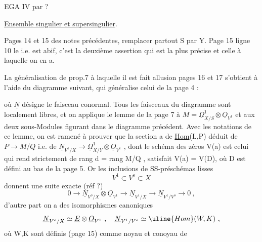 \margin{//}  

\margin{(}EGA IV par ?

\uline{Ensemble singulier et supersingulier}.

Pages 14 et 15 des notes précédentes, remplacer partout S par Y. Page
15 ligne 10 le i.e. est abif, c'est la deuxième assertion qui est la
plus précise et celle à laquelle on en a.

La généralisation de prop.7 à laquelle il est fait allusion pages 16
et 17 s'obtient à l'aide du diagramme suivant, qui généralise celui de la
page 4 :

où $\underline{N}$ désigne le faisceau conormal. Tous les faisceaux du diagramme sont
localement libres, et on applique le lemme de la page 7 à $M=\underline{\Omega}^1_{X/S}\otimes\underline{O}_{V^1}$
et aux deux sous-Modules figurant dans le diagramme précédent. Avec
les notations de ce lemme, on est ramené à prouver que la section a
 de \uline{Hom}(L,P) déduit de \inserted{$\mu$:} $P\rightarrow M/Q$ i.e. de \inserted{$\mu$:} $\underline{N}_{V^1/X}\longrightarrow\underline{\Omega}^1_{X/Y}\otimes\underline{O}_{V^1}$ ,
dont le schéma des zéros V(a) est celui qui rend \hand{$\mu$} strictement de rang
\hand{$<$} d = rang M/Q , satisfait V(a) = V(D), où D est défini au bas de la
page 5. Or les inclusions de SS-préschémas lisses
\margin{||}
\[ V^1 \subset V^o \subset X \]
donnent une suite exacte (réf ?)
\[ 0 \rightarrow \underline{N}_{V^o/X}\otimes\underline{O}_{V^1} \rightarrow \underline{N}_{V^1/X} \longrightarrow \underline{N}_{V^1/V^o} \rightarrow 0 \ , \]
d'autre part on a des isomorphismes canoniques
\[ \underline{N}_{V^o/X} \simeq \underline{E}\otimes\underline{O}_{V^1} \ , \quad \underline{N}_{V^1/V^o} \simeq \uline{Hom}(W,K) \ , \]
où W,K sont définis (page 15) comme noyau et conoyau de

